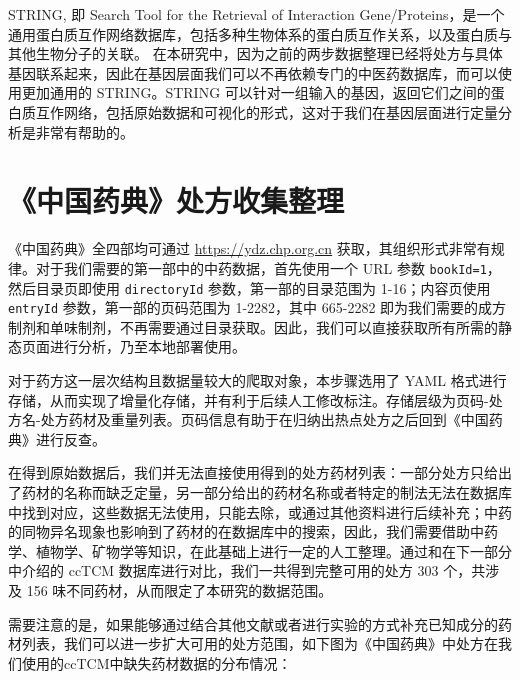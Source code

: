 STRING, 即 Search Tool for the Retrieval of Interaction Gene/Proteins，是一个通用蛋白质互作网络数据库，包括多种生物体系的蛋白质互作关系，以及蛋白质与其他生物分子的关联。\cite{Szklarczyk_Gable_Nastou_Lyon_Kirsch_Pyysalo_Doncheva_Legeay_Fang_Bork_et_al._2021} 在本研究中，因为之前的两步数据整理已经将处方与具体基因联系起来，因此在基因层面我们可以不再依赖专门的中医药数据库，而可以使用更加通用的 STRING。STRING 可以针对一组输入的基因，返回它们之间的蛋白质互作网络，包括原始数据和可视化的形式，这对于我们在基因层面进行定量分析是非常有帮助的。

\section{《中国药典》处方收集整理}

《中国药典》全四部均可通过 \url{https://ydz.chp.org.cn} 获取，其组织形式非常有规律。\cite{中华人民共和国药典}对于我们需要的第一部中的中药数据，首先使用一个 URL 参数 \texttt{bookId=1}，然后目录页即使用 \texttt{directoryId} 参数，第一部的目录范围为 1-16；内容页使用 \texttt{entryId} 参数，第一部的页码范围为 1-2282，其中 665-2282 即为我们需要的成方制剂和单味制剂，不再需要通过目录获取。因此，我们可以直接获取所有所需的静态页面进行分析，乃至本地部署使用。

对于药方这一层次结构且数据量较大的爬取对象，本步骤选用了 YAML 格式进行存储，从而实现了增量化存储，并有利于后续人工修改标注。存储层级为页码-处方名-处方药材及重量列表。页码信息有助于在归纳出热点处方之后回到《中国药典》进行反查。

在得到原始数据后，我们并无法直接使用得到的处方药材列表：一部分处方只给出了药材的名称而缺乏定量，另一部分给出的药材名称或者特定的制法无法在数据库中找到对应，这些数据无法使用，只能去除，或通过其他资料进行后续补充；中药的同物异名现象也影响到了药材的在数据库中的搜索，因此，我们需要借助中药学、植物学、矿物学等知识，在此基础上进行一定的人工整理。通过和在下一部分中介绍的 ccTCM 数据库进行对比，我们一共得到完整可用的处方 303 个，共涉及 156 味不同药材，从而限定了本研究的数据范围。

需要注意的是，如果能够通过结合其他文献或者进行实验的方式补充已知成分的药材列表，我们可以进一步扩大可用的处方范围，如下图为《中国药典》中处方在我们使用的ccTCM中缺失药材数据的分布情况：

